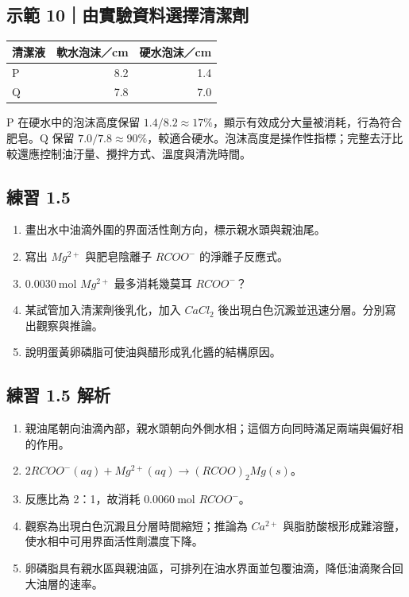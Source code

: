 \documentclass[11pt,a4paper]{article}
\newcounter{none}
\providecommand{\tightlist}{%
  \setlength{\itemsep}{0pt}\setlength{\parskip}{0pt}}
\begin{document}
\begin{HandoutWorkedExample}

\subsection{示範 10｜由實驗資料選擇清潔劑}\label{ux793aux7bc4-10ux7531ux5be6ux9a57ux8cc7ux6599ux9078ux64c7ux6e05ux6f54ux5291}

{\def\LTcaptype{none} %
\begin{longtable}[]{@{}lrr@{}}
\toprule\noalign{}
清潔液 & 軟水泡沫／cm & 硬水泡沫／cm \\
\midrule\noalign{}
\endhead
\bottomrule\noalign{}
\endlastfoot
P & 8.2 & 1.4 \\
Q & 7.8 & 7.0 \\
\end{longtable}
}

P 在硬水中的泡沫高度保留 \(1.4/8.2\approx17\%\)，顯示有效成分大量被消耗，行為符合肥皂。Q 保留 \(7.0/7.8\approx90\%\)，較適合硬水。泡沫高度是操作性指標；完整去汙比較還應控制油汙量、攪拌方式、溫度與清洗時間。

\end{HandoutWorkedExample}

\subsection{練習 1.5}\label{ux7df4ux7fd2-1.5}

\begin{enumerate}
\def\labelenumi{\arabic{enumi}.}
\tightlist
\item
  畫出水中油滴外圍的界面活性劑方向，標示親水頭與親油尾。
\item
  寫出 \(Mg^{2+}\) 與肥皂陰離子 \(RCOO^-\) 的淨離子反應式。
\item
  \(0.0030\ \mathrm{mol}\) \(Mg^{2+}\) 最多消耗幾莫耳 \(RCOO^-\)？
\item
  某試管加入清潔劑後乳化，加入 \(CaCl_2\) 後出現白色沉澱並迅速分層。分別寫出觀察與推論。
\item
  說明蛋黃卵磷脂可使油與醋形成乳化醬的結構原因。
\end{enumerate}

\subsection{練習 1.5 解析}\label{ux7df4ux7fd2-1.5-ux89e3ux6790}

\begin{enumerate}
\def\labelenumi{\arabic{enumi}.}
\tightlist
\item
  親油尾朝向油滴內部，親水頭朝向外側水相；這個方向同時滿足兩端與偏好相的作用。
\item
  \(2RCOO^-(aq)+Mg^{2+}(aq)\rightarrow(RCOO)_2Mg(s)\)。
\item
  反應比為 2：1，故消耗 \(0.0060\ \mathrm{mol}\) \(RCOO^-\)。
\item
  觀察為出現白色沉澱且分層時間縮短；推論為 \(Ca^{2+}\) 與脂肪酸根形成難溶鹽，使水相中可用界面活性劑濃度下降。
\item
  卵磷脂具有親水區與親油區，可排列在油水界面並包覆油滴，降低油滴聚合回大油層的速率。
\end{enumerate}
\end{document}
